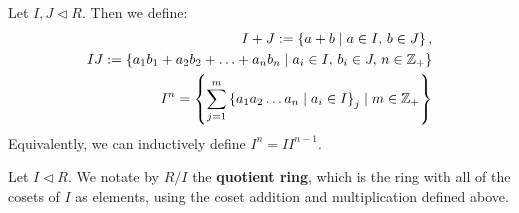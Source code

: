 \documentclass{memoir}
\begin{document}
\begin{defn}
	Let \(I,J \triangleleft R\). Then we define:
	\begin{align*}
		I + J := \left\{a+b \mid a \in I,\, b \in J \right\},\\
		IJ := \left\{ a_1b_1 + a_2b_2 + \ldots + a_nb_n \mid a_i \in I,\, b_i \in J,\, n \in \mathbb{Z}_+ \right\} \\
		I^{n} = \left\{\sum_{j=1}^{m} \left\{ a_1a_2\ldots a_n \mid a_i \in I \right\}_j  \mid m \in \mathbb{Z}_+ \right\} 
	\end{align*}
	Equivalently, we can inductively define \(I^{n}= II^{n-1}\).
\end{defn}


\begin{defn}
	Let \(I \triangleleft R\). We notate by \(R / I\) the \textbf{quotient ring}, which is the ring with all of the cosets of \(I\) as elements, using the coset addition and multiplication defined above.
\end{defn}
\end{document}
